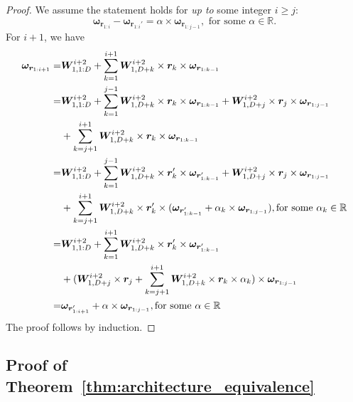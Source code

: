 \documentclass{article} \usepackage{iclr2020_conference,times}
\def\vr{{\bm{r}}}
\def\vomega{{\bm{\omega}}}
\def\mW{{\bm{W}}}
\def\sR{{\mathbb{R}}}
\begin{document}
\begin{proof}
We assume the statement holds for \emph{up to} some integer $i \geq j$:
\begin{equation*}
    \vomega_{\vr_{1:i}} - \vomega_{\vr_{1:i}'} =  \alpha \times \vomega_{\vr_{1:j-1}},\text{ for some } \alpha \in \sR.
\end{equation*}
For $i+1$, we have 
\begin{align*}
    \small 
    \vomega_{\vr_{1:i+1}} = & \mW^{i+2}_{1, 1:D} + \sum_{k=1}^{i+1} \mW^{i+2}_{1, D+k} \times \vr_{k} \times \vomega_{\vr_{1:k-1}} \\
    = & \mW^{i+2}_{1, 1:D} + \sum_{k=1}^{j-1} \mW^{i+2}_{1, D+k} \times \vr_{k} \times \vomega_{\vr_{1:k-1}} + \mW^{i+2}_{1, D+j} \times \vr_{j} \times \vomega_{\vr_{1:j-1}}\\
    & + \sum_{k=j+1}^{i+1} \mW^{i+2}_{1, D+k} \times \vr_{k} \times \vomega_{\vr_{1:k-1}}\\
    = & \mW^{i+2}_{1, 1:D} + \sum_{k=1}^{j-1} \mW^{i+2}_{1, D+k} \times \vr'_{k} \times \vomega_{\vr'_{1:k-1}} + \mW^{i+2}_{1, D+j} \times \vr_{j} \times \vomega_{\vr_{1:j-1}}\\
    & + \sum_{k=j+1}^{i+1} \mW^{i+2}_{1, D+k} \times \vr'_{k} \times (\vomega_{\vr'_{1:k-1}} + \alpha_k \times \vomega_{\vr_{1:j-1}}), \text{for some $\alpha_k \in \sR$}\\
    = & \mW^{i+2}_{1, 1:D} + \sum_{k=1}^{i+1} \mW^{i+2}_{1, D+k} \times \vr'_{k} \times \vomega_{\vr'_{1:k-1}}\\
    & + (\mW^{i+2}_{1, D+j} \times \vr_{j} + \sum_{k=j+1}^{i+1} \mW^{i+2}_{1, D+k} \times \vr_{k} \times \alpha_k) \times \vomega_{\vr_{1:j-1}}\\
    = & \vomega_{\vr'_{1:i+1}} + \alpha \times \vomega_{\vr_{1:j-1}}, \text{for some $\alpha \in \sR$}
\end{align*}
The proof follows by induction.
\end{proof}

\subsection{Proof of Theorem~\ref{thm:architecture_equivalence}}\label{appendix:proof:architect}
\end{document}
